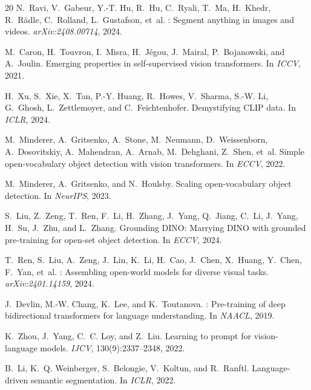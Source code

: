 \documentclass[11pt]{article}
\begin{document}
\begin{thebibliography}{20}
N.~Ravi, V.~Gabeur, Y.-T. Hu, R.~Hu, C.~Ryali, T.~Ma, H.~Khedr,
  R.~R{\"a}dle, C.~Rolland, L.~Gustafson, et~al.
: Segment anything in images and videos.
\newblock \emph{arXiv:2408.00714}, 2024.

M.~Caron, H.~Touvron, I.~Misra, H.~J\'egou, J.~Mairal, P.~Bojanowski, and
  A.~Joulin.
\newblock Emerging properties in self-supervised vision transformers.
\newblock In \emph{ICCV}, 2021.

H.~Xu, S.~Xie, X.~Tan, P.-Y. Huang, R.~Howes, V.~Sharma, S.-W. Li,
  G.~Ghosh, L.~Zettlemoyer, and C.~Feichtenhofer.
\newblock Demystifying {CLIP} data.
\newblock In \emph{ICLR}, 2024.

M.~Minderer, A.~Gritsenko, A.~Stone, M.~Neumann, D.~Weissenborn,
  A.~Dosovitskiy, A.~Mahendran, A.~Arnab, M.~Dehghani, Z.~Shen, et~al.
\newblock Simple open-vocabulary object detection with vision transformers.
\newblock In \emph{ECCV}, 2022.

M.~Minderer, A.~Gritsenko, and N.~Houlsby.
\newblock Scaling open-vocabulary object detection.
\newblock In \emph{NeurIPS}, 2023.

S.~Liu, Z.~Zeng, T.~Ren, F.~Li, H.~Zhang, J.~Yang, Q.~Jiang, C.~Li, J.~Yang,
  H.~Su, J.~Zhu, and L.~Zhang.
\newblock Grounding {DINO}: Marrying {DINO} with grounded pre-training for
  open-set object detection.
\newblock In \emph{ECCV}, 2024.

T.~Ren, S.~Liu, A.~Zeng, J.~Lin, K.~Li, H.~Cao, J.~Chen, X.~Huang, Y.~Chen,
  F.~Yan, et~al.
: Assembling open-world models for diverse visual
  tasks.
\newblock \emph{arXiv:2401.14159}, 2024.

J.~Devlin, M.-W. Chang, K.~Lee, and K.~Toutanova.
: Pre-training of deep bidirectional transformers for language
  understanding.
\newblock In \emph{NAACL}, 2019.

K.~Zhou, J.~Yang, C.~C. Loy, and Z.~Liu.
\newblock Learning to prompt for vision-language models.
\newblock \emph{IJCV}, 130(9):2337--2348, 2022.

B.~Li, K.~Q. Weinberger, S.~Belongie, V.~Koltun, and R.~Ranftl.
\newblock Language-driven semantic segmentation.
\newblock In \emph{ICLR}, 2022.


\end{thebibliography}
\end{document}
